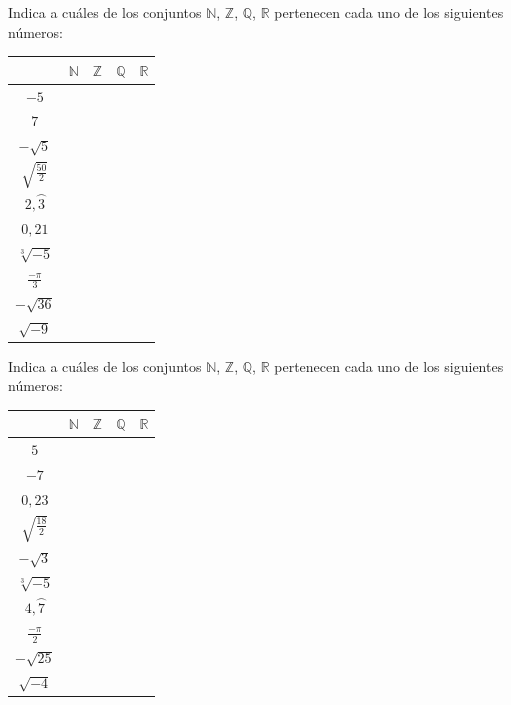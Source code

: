 \documentclass[addpoints,spanish, 12pt,a4paper]{exam}
\begin{document}
\begin{questions}

\question[1] Indica a cuáles de los conjuntos
$\mathbb{N}$, $\mathbb{Z}$, $\mathbb{Q}$, $\mathbb{R}$ pertenecen cada uno de los siguientes números:
\begin{center}
\begin{tabular}{|c |c |c |c |c|}\hline
&$\mathbb{N}$& $\mathbb{Z}$& $\mathbb{Q}$&$\mathbb{R}$\\ 
\hline
$-5$&&&&\\
\hline
$7$&&&&\\
\hline
$-\sqrt{5}$&&&&\\
\hline
$\sqrt{\frac{50}{2}}$&&&&\\
\hline
$2,\wideparen{3}$&&&&\\
\hline
$0,21$&&&&\\
\hline
$\sqrt[3]{-5}$&&&&\\
\hline
$\frac{-\pi}{3}$&&&&\\
\hline
$-\sqrt{36}$&&&&\\
\hline
$\sqrt{-9}$&&&&\\
\hline
\end{tabular}

\end{center}

\question[1] Indica a cuáles de los conjuntos
$\mathbb{N}$, $\mathbb{Z}$, $\mathbb{Q}$, $\mathbb{R}$ pertenecen cada uno de los siguientes números:
\begin{center}
\begin{tabular}{|c |c |c |c |c|}\hline
&$\mathbb{N}$& $\mathbb{Z}$& $\mathbb{Q}$&$\mathbb{R}$\\ 
\hline
$5$&&&&\\
\hline
$-7$&&&&\\
\hline
$0,23$&&&&\\
\hline
$\sqrt{\frac{18}{2}}$&&&&\\
\hline
$-\sqrt{3}$&&&&\\
\hline
$\sqrt[3]{-5}$&&&&\\
\hline
$4,\wideparen{7}$&&&&\\
\hline
$\frac{-\pi}{2}$&&&&\\
\hline
$-\sqrt{25}$&&&&\\
\hline
$\sqrt{-4}$&&&&\\
\hline
\end{tabular}

\end{center}


\end{questions}
\end{document}
